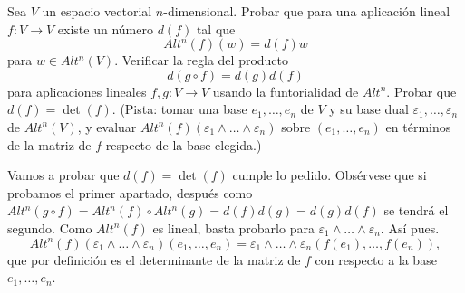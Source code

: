 \documentclass[twoside]{article}
\begin{document}
\begin{ejercicio}{2.12}
Sea $V$ un espacio vectorial $n$-dimensional. Probar que para una aplicación lineal $f:V\to V$ existe un número $d(f)$ tal que
\[
Alt^n(f)(w)=d(f)w
\]
para $w\in Alt^n(V)$. Verificar la regla del producto
\[
d(g\circ f)=d(g)d(f)
\]
para aplicaciones lineales $f,g:V\to V$ usando la funtorialidad de $Alt^n$. Probar que $d(f)=\det(f)$. (Pista: tomar una base $e_1,\dots, e_n$ de $V$ y su base dual $\varepsilon_1,\dots,\varepsilon_n$ de $Alt^n(V)$, y evaluar $Alt^n(f)(\varepsilon_1\land\dots\land\varepsilon_n)$ sobre $(e_1,\dots, e_n)$ en términos de la matriz de $f$ respecto de la base elegida.)
\end{ejercicio}
\begin{solucion}
Vamos a probar que $d(f)=\det(f)$ cumple lo pedido. Obsérvese que si probamos el primer apartado, después como $Alt^n(g\circ f)=Alt^n(f)\circ Alt^n(g)=d(f)d(g)=d(g)d(f)$ se tendrá el segundo. Como $Alt^n(f)$ es lineal, basta probarlo para $\varepsilon_1\land\dots\land\varepsilon_n$. Así pues.
\[
Alt^n(f)(\varepsilon_1\land\dots\land\varepsilon_n)(e_1,\dots, e_n)=\varepsilon_1\land\dots\land\varepsilon_n(f(e_1),\dots, f(e_n)),
\]
que por definición es el determinante de la matriz de $f$ con respecto a la base $e_1,\dots, e_n$. 
\end{solucion}
\end{document}
